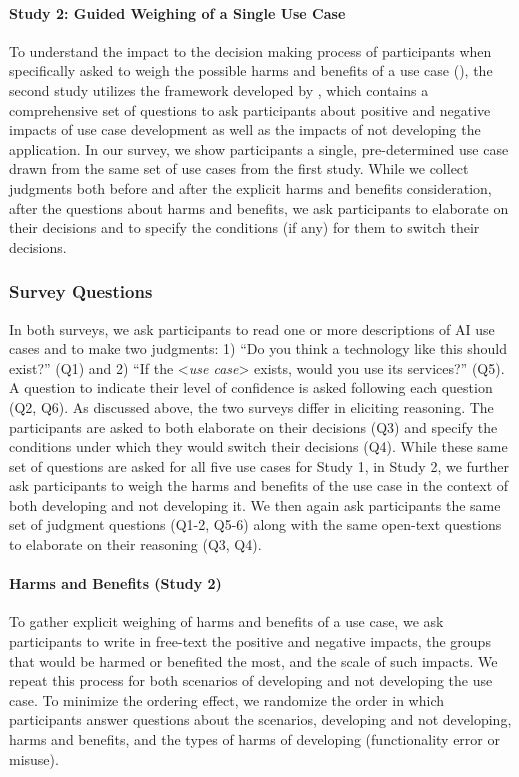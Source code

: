 \paragraph{Study 2: Guided Weighing of a Single Use Case}
To understand the impact to the decision making process of participants when specifically asked to weigh the possible harms and benefits of a use case (\reasoningeffect), the second study utilizes the framework developed by \citet{mun2024participaidemocraticsurveyingframework}, which contains a comprehensive set of questions to ask participants about positive and negative impacts of use case development as well as the impacts of not developing the application. In our survey, we show participants a single, pre-determined use case drawn from the same set of use cases from the first study. While we collect judgments both before and after the explicit harms and benefits consideration, after the questions about harms and benefits, we ask participants to elaborate on their decisions and to specify the conditions (if any) for them to switch their decisions.

\subsubsection{Survey Questions}
\label{sssec:survey-qs}
In both surveys, we ask participants to read one or more descriptions of AI use cases and to make two judgments: 1) ``Do you think a technology like this should exist?'' (Q1) and 2) ``If the <\textit{use case}> exists, would you use its services?'' (Q5). A question to indicate their level of confidence is asked following each question (Q2, Q6). As discussed above, the two surveys differ in eliciting reasoning. The participants are asked to both elaborate on their decisions (Q3) and specify the conditions under which they would switch their decisions (Q4). While these same set of questions are asked for all five use cases for Study 1, in Study 2, we further ask participants to weigh the harms and benefits of the use case in the context of both developing and not developing it. We then again ask participants the same set of judgment questions (Q1-2, Q5-6) along with the same open-text questions to elaborate on their reasoning (Q3, Q4).

\paragraph{Harms and Benefits (Study 2)} 
To gather explicit weighing of harms and benefits of a use case, we ask participants to write in free-text the positive and negative impacts, the groups that would be harmed or benefited the most, and the scale of such impacts. We repeat this process for both scenarios of developing and not developing the use case. To minimize the ordering effect, we randomize the order in which participants answer questions about the scenarios, developing and not developing, harms and benefits, and the types of harms of developing (functionality error or misuse).

